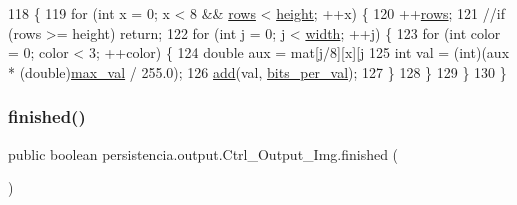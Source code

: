\begin{DoxyCode}
118     \{
119         \textcolor{keywordflow}{for} (\textcolor{keywordtype}{int} x = 0; x < 8 && \hyperlink{classpersistencia_1_1output_1_1Ctrl__Output__Img_a586ee8128a26b6786471e040a705bdbc}{rows} < \hyperlink{classpersistencia_1_1output_1_1Ctrl__Output__Img_a1d7bc52c64c79e8545ae6d1ae8b9ee2e}{height}; ++x) \{
120             ++\hyperlink{classpersistencia_1_1output_1_1Ctrl__Output__Img_a586ee8128a26b6786471e040a705bdbc}{rows};
121             \textcolor{comment}{//if (rows >= height) return;}
122             \textcolor{keywordflow}{for} (\textcolor{keywordtype}{int} j = 0; j < \hyperlink{classpersistencia_1_1output_1_1Ctrl__Output__Img_ae4a01ec459078cece4815d2fe7db8a64}{width}; ++j) \{
123                 \textcolor{keywordflow}{for} (\textcolor{keywordtype}{int} color = 0; color < 3; ++color) \{
124                     \textcolor{keywordtype}{double} aux = mat[j/8][x][j%
125                     \textcolor{keywordtype}{int} val = (int)(aux * (\textcolor{keywordtype}{double})\hyperlink{classpersistencia_1_1output_1_1Ctrl__Output__Img_ab9e685dae026afe43188c62d7c4fad53}{max\_val} / 255.0);
126                     \hyperlink{classpersistencia_1_1output_1_1Ctrl__Output__Img_a305a977f4d4b999cf65e14e7106b6c5e}{add}(val, \hyperlink{classpersistencia_1_1output_1_1Ctrl__Output__Img_ad40e63d16abd9058889249f5ad84f200}{bits\_per\_val});
127                 \}
128             \}
129         \}
130     \}
\end{DoxyCode}
\mbox{\label{classpersistencia_1_1output_1_1Ctrl__Output__Img_a365d043ee5bd08c4e470bff468773552}} 
\subsubsection{\texorpdfstring{finished()}{finished()}}
{\footnotesize\ttfamily public boolean persistencia.\+output.\+Ctrl\+\_\+\+Output\+\_\+\+Img.\+finished (\begin{DoxyParamCaption}{ }\end{DoxyParamCaption})\hspace{0.3cm}{\ttfamily [inline]}}



